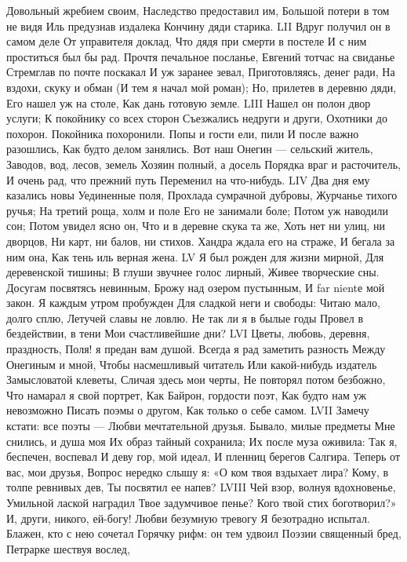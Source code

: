 Довольный жребием своим,
Наследство предоставил им,
Большой потери в том не видя
Иль предузнав издалека
Кончину дяди старика.
LII
Вдруг получил он в самом деле
От управителя доклад,
Что дядя при смерти в постеле
И с ним проститься был бы рад.
Прочтя печальное посланье,
Евгений тотчас на свиданье
Стремглав по почте поскакал
И уж заранее зевал,
Приготовляясь, денег ради,
На вздохи, скуку и обман
(И тем я начал мой роман);
Но, прилетев в деревню дяди,
Его нашел уж на столе,
Как дань готовую земле.
LIII
Нашел он полон двор услуги;
К покойнику со всех сторон
Съезжались недруги и други,
Охотники до похорон.
Покойника похоронили.
Попы и гости ели, пили
И после важно разошлись,
Как будто делом занялись.
Вот наш Онегин — сельский житель,
Заводов, вод, лесов, земель
Хозяин полный, а досель
Порядка враг и расточитель,
И очень рад, что прежний путь
Переменил на что-нибудь.
LIV
Два дня ему казались новы
Уединенные поля,
Прохлада сумрачной дубровы,
Журчанье тихого ручья;
На третий роща, холм и поле
Его не занимали боле;
Потом уж наводили сон;
Потом увидел ясно он,
Что и в деревне скука та же,
Хоть нет ни улиц, ни дворцов,
Ни карт, ни балов, ни стихов.
Хандра ждала его на страже,
И бегала за ним она,
Как тень иль верная жена.
LV
Я был рожден для жизни мирной,
Для деревенской тишины;
В глуши звучнее голос лирный,
Живее творческие сны.
Досугам посвятясь невинным,
Брожу над озером пустынным,
И far nientе мой закон.
Я каждым утром пробужден
Для сладкой неги и свободы:
Читаю мало, долго сплю,
Летучей славы не ловлю.
Не так ли я в былые годы
Провел в бездействии, в тени
Мои счастливейшие дни?
LVI
Цветы, любовь, деревня, праздность,
Поля! я предан вам душой.
Всегда я рад заметить разность
Между Онегиным и мной,
Чтобы насмешливый читатель
Или какой-нибудь издатель
Замысловатой клеветы,
Сличая здесь мои черты,
Не повторял потом безбожно,
Что намарал я свой портрет,
Как Байрон, гордости поэт,
Как будто нам уж невозможно
Писать поэмы о другом,
Как только о себе самом.
LVII
Замечу кстати: все поэты —
Любви мечтательной друзья.
Бывало, милые предметы
Мне снились, и душа моя
Их образ тайный сохранила;
Их после муза оживила:
Так я, беспечен, воспевал
И деву гор, мой идеал,
И пленниц берегов Салгира.
Теперь от вас, мои друзья,
Вопрос нередко слышу я:
«О ком твоя вздыхает лира?
Кому, в толпе ревнивых дев,
Ты посвятил ее напев?
LVIII
Чей взор, волнуя вдохновенье,
Умильной лаской наградил
Твое задумчивое пенье?
Кого твой стих боготворил?»
И, други, никого, ей-богу!
Любви безумную тревогу
Я безотрадно испытал.
Блажен, кто с нею сочетал
Горячку рифм: он тем удвоил
Поэзии священный бред,
Петрарке шествуя вослед,

